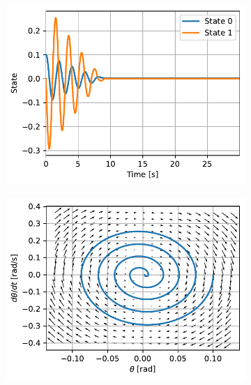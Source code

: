 \documentclass{cmc}
\begin{document}
\begin{figure}[H]
  \centering
  \begin{subfigure}[b]{0.49\textwidth}
    { \centering
      \includegraphics[width=\textwidth]{figures/State_with_dry_friction_(x0=[0dot1,_0])}
      \label{fig:pendulum-basic-state}
    }
    \caption{}
  \end{subfigure}
  \begin{subfigure}[b]{0.49\textwidth}
    { \centering
      \includegraphics[width=\textwidth]{figures/Phase_with_dry_friction_(x0=[0dot1,_0])}
      \label{fig:pendulum-basic-phase}
    }
    \caption{}
  \end{subfigure}
  \caption{}
  \label{fig:pendulum-basic}
\end{figure}
\end{document}
